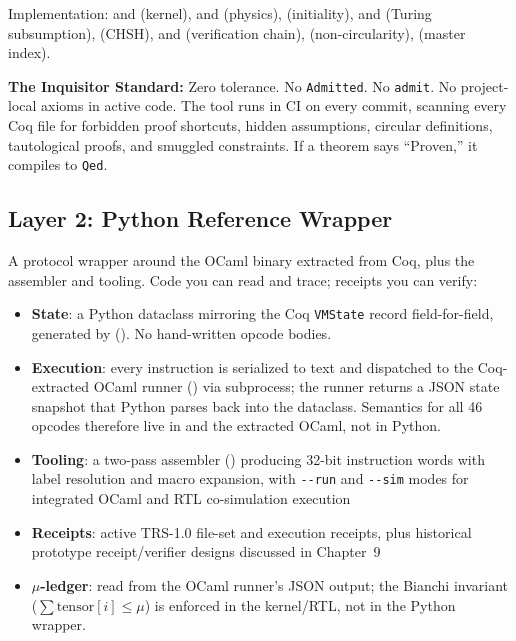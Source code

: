 Implementation:  and  (kernel),  and  (physics),  (initiality),  and  (Turing subsumption),  (CHSH),  and  (verification chain),  (non-circularity),  (master index).

\textbf{The Inquisitor Standard:} Zero tolerance. No \texttt{Admitted}. No \texttt{admit}. No project-local axioms in active code. The  tool runs in CI on every commit, scanning every Coq file for forbidden proof shortcuts, hidden assumptions, circular definitions, tautological proofs, and smuggled constraints. If a theorem says ``Proven,'' it compiles to \texttt{Qed}.

\subsection{Layer 2: Python Reference Wrapper}

A protocol wrapper around the OCaml binary extracted from Coq, plus the assembler and tooling. Code you can read and trace; receipts you can verify:

\begin{itemize}
    \item \textbf{State}: a Python dataclass mirroring the Coq \texttt{VMState} record field-for-field, generated by  (). No hand-written opcode bodies.

    \item \textbf{Execution}: every instruction is serialized to text and dispatched to the Coq-extracted OCaml runner () via subprocess; the runner returns a JSON state snapshot that Python parses back into the dataclass. Semantics for all 46 opcodes therefore live in  and the extracted OCaml, not in Python.

    \item \textbf{Tooling}: a two-pass assembler () producing 32-bit instruction words with label resolution and macro expansion, with \texttt{-{}-run} and \texttt{-{}-sim} modes for integrated OCaml and RTL co-simulation execution

    \item \textbf{Receipts}: active TRS-1.0 file-set and execution receipts, plus historical prototype receipt/verifier designs discussed in Chapter~9

    \item \textbf{$\mu$-ledger}: read from the OCaml runner's JSON output; the Bianchi invariant ($\sum\text{tensor}[i] \le \mu$) is enforced in the kernel/RTL, not in the Python wrapper.
\end{itemize}

